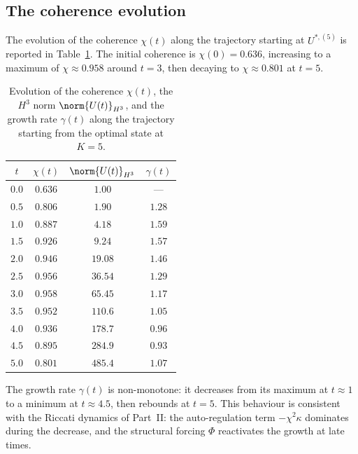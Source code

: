 \subsection{The coherence evolution}
\label{part-4:ssec:coherence-numeric}

The evolution of the coherence $\chi(t)$ along the trajectory 
starting at $U^{\ast,(5)}$ is reported in Table~\ref{part-4:tab:chi-evolution}. 
The initial coherence is $\chi(0)=0.636$, increasing to a maximum of 
$\chi \approx 0.958$ around $t=3$, then decaying to $\chi\approx0.801$ 
at $t=5$.

\begin{table}[h]
\centering
\caption{Evolution of the coherence $\chi(t)$, the $H^3$ norm 
$\norm{U(t)}_{H^3}$, and the growth rate $\gamma(t)$ along the 
trajectory starting from the optimal state at $K=5$.}
\label{part-4:tab:chi-evolution}
\begin{tabular}{cccc}
\toprule
$t$ & $\chi(t)$ & $\norm{U(t)}_{H^3}$ & $\gamma(t)$ \\
\midrule
$0.0$ & $0.636$ & $1.00$ & --- \\
$0.5$ & $0.806$ & $1.90$ & $1.28$ \\
$1.0$ & $0.887$ & $4.18$ & $1.59$ \\
$1.5$ & $0.926$ & $9.24$ & $1.57$ \\
$2.0$ & $0.946$ & $19.08$ & $1.46$ \\
$2.5$ & $0.956$ & $36.54$ & $1.29$ \\
$3.0$ & $0.958$ & $65.45$ & $1.17$ \\
$3.5$ & $0.952$ & $110.6$ & $1.05$ \\
$4.0$ & $0.936$ & $178.7$ & $0.96$ \\
$4.5$ & $0.895$ & $284.9$ & $0.93$ \\
$5.0$ & $0.801$ & $485.4$ & $1.07$ \\
\bottomrule
\end{tabular}
\end{table}

\begin{remark}\label{part-4:rem:non-monotone}
The growth rate $\gamma(t)$ is non-monotone: it decreases from its 
maximum at $t\approx1$ to a minimum at $t\approx4.5$, then rebounds 
at $t=5$. This behaviour is consistent with the Riccati dynamics of 
Part~II: the auto-regulation term $-\chi^2\kappa$ dominates during 
the decrease, and the structural forcing $\Phi$ reactivates the 
growth at late times.
\end{remark}

